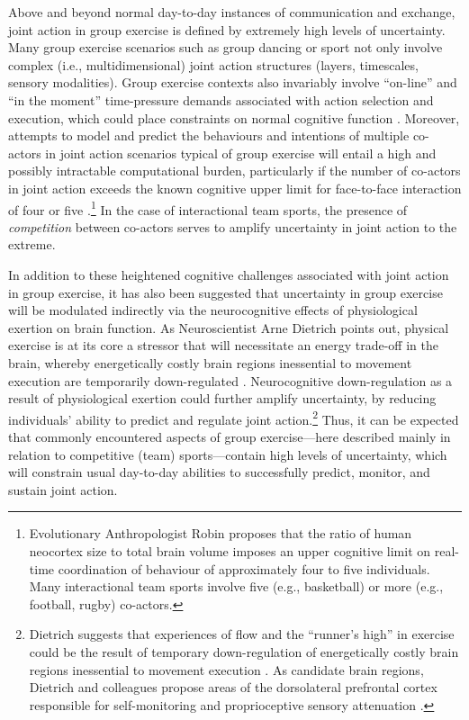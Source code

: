 \begin{CJK}{UTF8}{gbsn}
Above and beyond normal day-to-day instances of communication and exchange, joint action in group exercise is defined by extremely high levels of uncertainty.  Many group exercise scenarios such as group dancing or sport not only involve complex (i.e., multidimensional) joint action structures (layers, timescales, sensory modalities).  Group exercise contexts also invariably involve ``on-line'' and ``in the moment'' time-pressure demands associated with action selection and execution, which could place constraints on normal cognitive function \citep[as has been shown in laboratory studies of decision-making studies;][]{Kerstholt1994,Maule2000}.  Moreover, attempts to model and predict the behaviours and intentions of multiple co-actors in joint action scenarios typical of group exercise will entail a high and possibly intractable computational burden, particularly if the number of co-actors in joint action exceeds the known cognitive upper limit for face-to-face interaction of four or five \citep{Dunbar1992}.\footnote{Evolutionary Anthropologist Robin \textcite{Dunbar1992} proposes that the ratio of human neocortex size to total brain volume imposes an upper cognitive limit on real-time coordination of behaviour of approximately four to five individuals.  Many interactional team sports involve five (e.g., basketball) or more (e.g., football, rugby) co-actors.}  In the case of interactional team sports, the presence of \textit{competition} between co-actors \citep[whereby one individual or team of individuals actively attempts to foil or disrupt the actions of another individual or team of individuals;  see][]{Reimer2006} serves to amplify uncertainty in joint action to the extreme.

In addition to these heightened cognitive challenges associated with joint action in group exercise, it has also been suggested that uncertainty in group exercise will be modulated indirectly via the neurocognitive effects of physiological exertion on brain function.  As Neuroscientist Arne Dietrich points out, physical exercise is at its core a stressor that will necessitate an energy trade-off in the brain, whereby energetically costly brain regions inessential to movement execution are temporarily down-regulated \citep{Dietrich2004b}. Neurocognitive down-regulation as a result of physiological exertion could further amplify uncertainty, by reducing individuals' ability to predict and regulate joint action.\footnote{Dietrich suggests that experiences of flow and the ``runner's high'' in exercise could be the result of temporary down-regulation of energetically costly brain regions inessential to movement execution \citep{Dietrich2004b}.  As candidate brain regions, Dietrich and colleagues propose areas of the dorsolateral prefrontal cortex responsible for self-monitoring and proprioceptive sensory attenuation \citep[commonly known as the ``inner critic'' regions of the brain; see][]{Limb2008}.}  Thus, it can be expected that commonly encountered aspects of group exercise---here described mainly in relation to competitive (team) sports---contain high levels of uncertainty, which will constrain usual day-to-day abilities to successfully predict, monitor, and sustain joint action.


\end{CJK}
